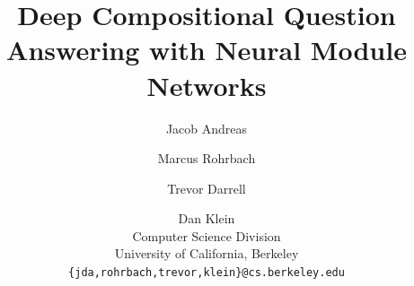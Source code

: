 \documentclass[10pt,twocolumn,letterpaper]{article}
\begin{document}
\newcommand{\nmn}{Neural Module Networks\xspace}
\newcommand{\mod}[1]{{\small\texttt{#1}}}
\newcommand{\todo}{\textcolor{red}}
\newcommand{\shapes}{{\textsc{shapes}}\xspace}
\newcommand{\cocoqa}{{\textsc{CocoQA}}\xspace}
\newcommand{\marcus}[1]{\textcolor{blue}{Marcus: #1}}
\title{Deep Compositional Question Answering with Neural Module Networks}

\author{Jacob Andreas \and Marcus Rohrbach \and Trevor Darrell \and Dan Klein \\
Computer Science Division\\
University of California, Berkeley\\
{\tt\small \{jda,rohrbach,trevor,klein\}@cs.berkeley.edu}
}

\maketitle
\end{document}
